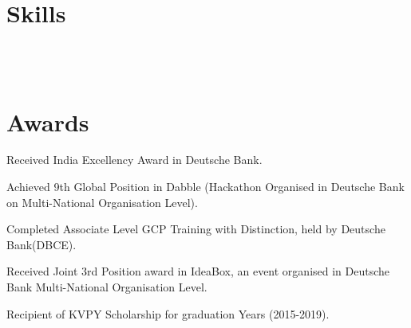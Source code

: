 \documentclass[]{resume-openfont}
\begin{document}
\section{Skills}
\begin{resumeSkillList}
    \\
    \\
\end{resumeSkillList}
\sectionsep

\section{Awards}
\begin{tightemize}
\item Received India Excellency Award in Deutsche Bank.
\item Achieved 9th Global Position in Dabble (Hackathon Organised in Deutsche Bank on Multi-National Organisation Level).
\item Completed Associate Level GCP Training with Distinction, held by Deutsche Bank(DBCE).
\item Received Joint 3rd Position award in IdeaBox, an event organised in Deutsche Bank Multi-National Organisation Level.
\item Recipient of KVPY Scholarship for graduation Years (2015-2019).
\end{tightemize}
\sectionsep
\end{document}
